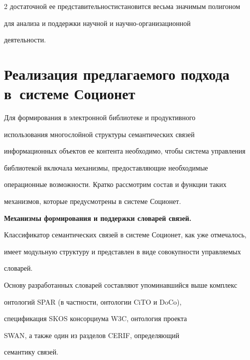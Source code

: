 \begin{multicols}{2}
достаточной ее представительности\linebreak становится весьма значимым полигоном 


для анализа и поддержки научной и на\-уч\-но-ор\-га\-ни\-за\-ци\-он\-ной 


деятельности. 





\section{Реализация предлагаемого подхода в~системе Соционет}





  Для формирования в электронной библиотеке и продуктивного 


использования многослойной структуры семантических связей 


информационных объектов ее контента необходимо, чтобы система управления 


библиотекой включала механизмы, предоставляющие необходимые 


операционные возможности. Кратко рассмотрим состав и функции таких 


механизмов, которые предусмотрены в системе Соционет.


  


  \smallskip


  


  \textbf{Механизмы формирования и поддержки словарей связей.} 


Классификатор семантических связей в сис\-те\-ме Соционет, как уже отмечалось, 


имеет модульную структуру и представлен в виде совокупности управляемых 


словарей. 


  


  Основу разработанных словарей составляют упоминавшийся выше комплекс 


онтологий {SPAR} (в частности, онтологии {CiTO} и {DoCo}), 


спецификация {SKOS} консорциума {W3C}, онтология проекта 


{SWAN}, а также один из разделов {CERIF}, опре\-де\-ля\-ющий 


семантику связей. 



\end{multicols}
